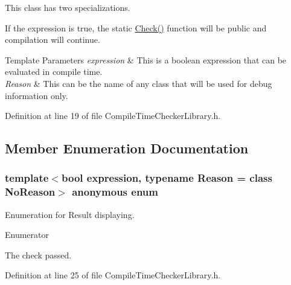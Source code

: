 This class has two specializations. 

If the expression is true, the static \hyperlink{class_compile_check_a0b48338cd3cb0e57b5d5182a1400f847}{Check()} function will be public and compilation will continue.


\begin{DoxyTemplParams}{Template Parameters}
{\em expression} & This is a boolean expression that can be evaluated in compile time. \\
\hline
{\em Reason} & This can be the name of any class that will be used for debug information only. \\
\hline
\end{DoxyTemplParams}


Definition at line 19 of file Compile\-Time\-Checker\-Library.\-h.



\subsection{Member Enumeration Documentation}
\hypertarget{class_compile_check_a23f09425353e49afb718c608ee4e14ee}{\subsubsection[{anonymous enum}]{\setlength{\rightskip}{0pt plus 5cm}template$<$bool expression, typename Reason  = class No\-Reason$>$ anonymous enum}}\label{class_compile_check_a23f09425353e49afb718c608ee4e14ee}


Enumeration for Result displaying. 

\begin{Desc}
\item[Enumerator]\par
\begin{description}
\item[{\em 
\hypertarget{class_compile_check_a23f09425353e49afb718c608ee4e14eeae1aaa6a952694dd245ce18936fb2b758}{Result}\label{class_compile_check_a23f09425353e49afb718c608ee4e14eeae1aaa6a952694dd245ce18936fb2b758}
}]The check passed. \end{description}
\end{Desc}


Definition at line 25 of file Compile\-Time\-Checker\-Library.\-h.



